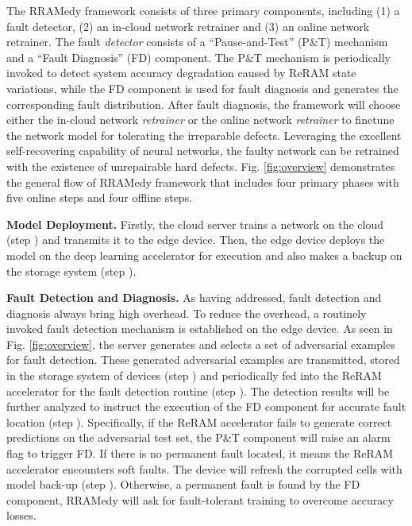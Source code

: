 The RRAMedy framework consists of three primary components, including (1) a fault detector, (2) an in-cloud network retrainer and (3) an online network retrainer. The fault \emph{detector} consists of a ``Pause-and-Test'' (P\&T) mechanism and a ``Fault Diagnosis'' (FD) component.  The P\&T mechanism is periodically invoked to detect system accuracy degradation caused by ReRAM state variations, while the FD component is used for fault diagnosis and generates the corresponding fault distribution. After fault diagnosis,  the framework will choose either the in-cloud network \emph{retrainer} or the online network \emph{retrainer} to finetune the network model for tolerating the irreparable defects. Leveraging the excellent self-recovering capability of neural networks, the faulty network can be retrained with the existence  of unrepairable hard defects. Fig. \ref{fig:overview} demonstrates the general flow of RRAMedy framework that includes four primary phases with five online steps and four offline steps.                                                                                            
                                                                                                
\textbf{Model Deployment.} Firstly, the cloud server trains a network on the cloud (step ) and transmits it to the edge device. Then, the edge device deploys the model on the deep learning accelerator for execution and also makes a backup on the storage system (step ).
                                                                                                        
\textbf{Fault Detection and Diagnosis.} As having addressed, fault detection and diagnosis always bring high overhead. To reduce the overhead, a routinely invoked fault detection mechanism is established on the edge device. As seen in Fig. \ref{fig:overview}, the server generates and selects a set of adversarial examples for fault detection. These generated adversarial examples are transmitted, stored in the storage system of devices (step ) and periodically fed into the ReRAM accelerator for the fault detection routine (step ). The detection results will be further analyzed to instruct the execution of the FD component for accurate fault location (step ). Specifically, if the ReRAM accelerator fails to generate correct predictions on the adversarial test set, the P\&T component will raise an alarm flag to trigger FD. If there is no permanent fault located, it means the ReRAM accelerator encounters soft faults. The device will refresh the corrupted cells with model back-up (step ). Otherwise, a permanent fault is found by the FD component, RRAMedy will ask for fault-tolerant training to overcome accuracy losses.
                                                                                                                
